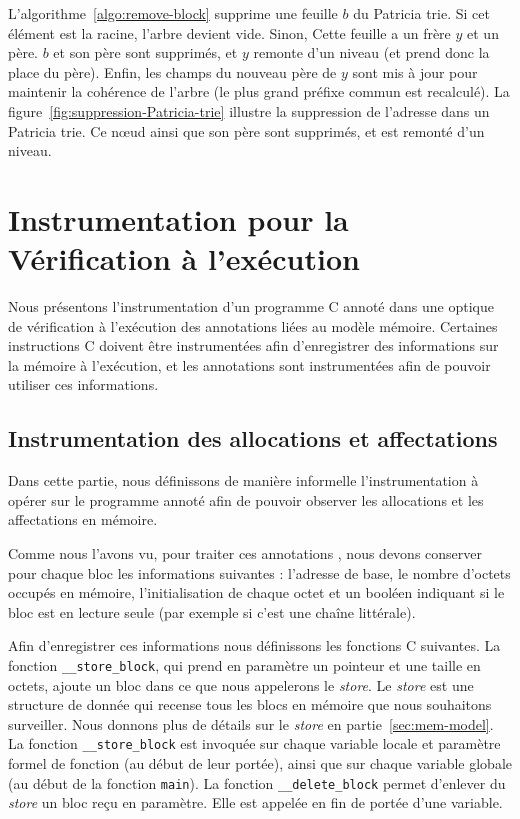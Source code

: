 


L'algorithme~\ref{algo:remove-block} supprime une feuille $b$ du Patricia trie.
Si cet élément est la racine, l'arbre devient vide.
Sinon, Cette feuille a un frère $y$ et un père.
$b$ et son père sont supprimés, et $y$ remonte d'un niveau (et prend donc la
place du père).
Enfin, les champs du nouveau père de $y$ sont mis à jour pour maintenir la
cohérence de l'arbre (le plus grand préfixe commun est recalculé).
La figure~\ref{fig:suppression-Patricia-trie} illustre la suppression de
l'adresse  dans un Patricia trie.
Ce n\oe{}ud ainsi que son père  sont supprimés, et
 est remonté d'un niveau.


\section{Instrumentation pour la Vérification à l'exécution}
\label{sec:mem-instru}


Nous présentons l'instrumentation d'un programme C annoté dans une optique de
vérification à l'exécution des annotations liées au modèle mémoire.
Certaines instructions C doivent être instrumentées afin d'enregistrer
des informations sur la mémoire à l'exécution, et les annotations sont
instrumentées afin de pouvoir utiliser ces informations.


\subsection{Instrumentation des allocations et affectations}


Dans cette partie, nous définissons de manière informelle l'instrumentation à
opérer sur le programme annoté afin de pouvoir observer les allocations et
les affectations en mémoire.

Comme nous l'avons vu, pour traiter ces annotations \eacsl, nous devons
conserver pour chaque bloc les informations suivantes : l'adresse de base, le
nombre d'octets occupés en mémoire, l'initialisation de chaque octet et un
booléen indiquant si le bloc est en lecture seule (par exemple si c'est une
chaîne littérale).

Afin d'enregistrer ces informations nous définissons les fonctions C suivantes.
La fonction \lstinline'__store_block', qui prend en paramètre un pointeur et une
taille en octets, ajoute un bloc dans ce que nous appelerons le \textit{store}.
Le \textit{store} est une structure de donnée qui recense tous les blocs en
mémoire que nous souhaitons surveiller.
Nous donnons plus de détails sur le \textit{store} en
partie~\ref{sec:mem-model}.
La fonction \lstinline'__store_block' est invoquée sur chaque variable locale
et paramètre formel de fonction (au début de leur portée), ainsi que sur chaque
variable globale (au début de la fonction \lstinline'main').
La fonction \lstinline'__delete_block' permet d'enlever du \textit{store} un
bloc reçu en paramètre.
Elle est appelée en fin de portée d'une variable.

